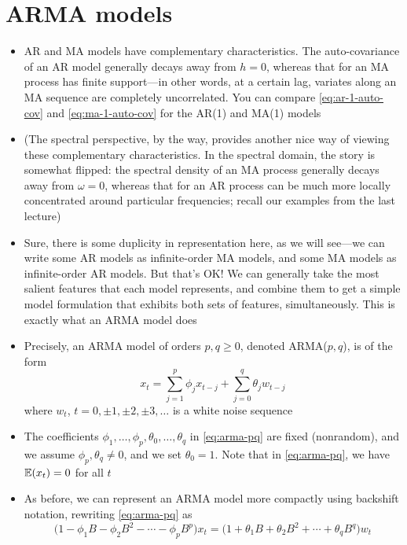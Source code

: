 \documentclass{article}
\begin{document}
\section{ARMA models}

\begin{itemize}
\item AR and MA models have complementary characteristics. The auto-covariance
  of an AR model generally decays away from $h=0$, whereas that for an MA
  process has finite support---in other words, at a certain lag, variates along
  an MA sequence are completely uncorrelated. You can compare
  \eqref{eq:ar-1-auto-cov} and \eqref{eq:ma-1-auto-cov} for the AR(1) and MA(1)
  models

\item (The spectral perspective, by the way, provides another nice way of
  viewing these complementary characteristics. In the spectral domain, the story
  is somewhat flipped: the spectral density of an MA process generally decays
  away from $\omega=0$, whereas that for an AR process can be much more locally
  concentrated around particular frequencies; recall our examples from the last
  lecture) 

\item Sure, there is some duplicity in representation here, as we will see---we
  can write some AR models as infinite-order MA models, and some MA models as  
  infinite-order AR models. But that's OK! We can generally take the most
  salient features that each model represents, and combine them to get a simple
  model formulation that exhibits both sets of features, simultaneously. This is
  exactly what an ARMA model does      

\item Precisely, an ARMA model of orders $p,q \geq 0$, denoted ARMA($p,q$), is
  of the form 
  \begin{equation}
  \label{eq:arma-pq}
  x_t = \sum_{j=1}^p \phi_j x_{t-j} + \sum_{j=0}^q \theta_j w_{t-j}  
  \end{equation}
  where $w_t$, $t = 0, \pm 1, \pm 2, \pm 3, \dots$ is a white noise sequence 

\item The coefficients $\phi_1,\dots,\phi_p,\theta_0,\dots,\theta_q$ in
  \eqref{eq:arma-pq} are fixed (nonrandom), and we assume $\phi_p,\theta_q \not=
  0$, and we set $\theta_0 = 1$. Note that in \eqref{eq:arma-pq}, we have
  $\mathbb{E}(x_t) = 0$ for all $t$ 

\item As before, we can represent an ARMA model more compactly using backshift 
  notation, rewriting \eqref{eq:arma-pq} as
  \begin{equation}
  \label{eq:arma-pq-backshift}
  \Big(1 - \phi_1 B - \phi_2 B^2 - \cdots - \phi_p B^p \Big) x_t = 
  \Big(1 + \theta_1 B + \theta_2 B^2 + \cdots + \theta_q B^q \Big) w_t   
  \end{equation}


\end{itemize}
\end{document}

